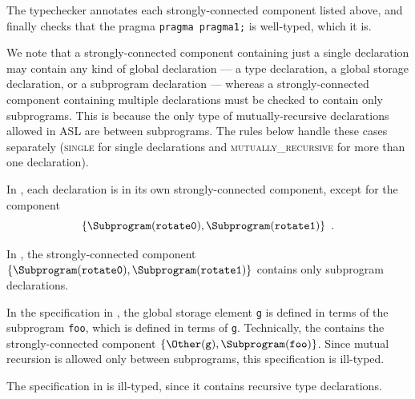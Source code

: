 The typechecker annotates each strongly-connected component listed above,
and finally checks that the pragma \verb|pragma pragma1;| is well-typed, which it is.



We note that a strongly-connected component containing just a single declaration may contain
any kind of global declaration ---
a type declaration, a global storage declaration, or a subprogram declaration ---
whereas a strongly-connected component containing multiple declarations must be checked
to contain only subprograms. This is because the only type of mutually-recursive declarations
allowed in ASL are between subprograms. The rules below handle these cases separately (\textsc{single}
for single declarations and \textsc{mutually\_recursive} for more than one declaration).

In ,
each declaration is in its own strongly-connected component,
except for the component
\[
\{ \Subprogram(\rotatezero), \Subprogram(\rotateone) \} \enspace.
\]



In ,
the strongly-connected component
$\{ \Subprogram(\rotatezero), \Subprogram(\rotateone) \}$
contains only subprogram declarations.

In the specification in ,
the global storage element \verb|g| is defined in terms of the
subprogram \verb|foo|, which is defined in terms of \verb|g|.
%
Technically, the \dependencygraphterm{} contains the strongly-connected
component $\{\Other(\vg), \Subprogram(\foo)\}$.
%
Since mutual recursion is allowed only between subprograms,
this specification is ill-typed.


The specification in  is ill-typed,
since it contains recursive type declarations.

